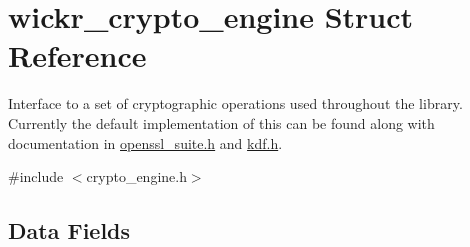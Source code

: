\hypertarget{structwickr__crypto__engine}{}\section{wickr\+\_\+crypto\+\_\+engine Struct Reference}
\label{structwickr__crypto__engine}


Interface to a set of cryptographic operations used throughout the library. Currently the default implementation of this can be found along with documentation in \mbox{\hyperlink{openssl__suite_8h_source}{openssl\+\_\+suite.\+h}} and \mbox{\hyperlink{kdf_8h_source}{kdf.\+h}}.  




{\ttfamily \#include $<$crypto\+\_\+engine.\+h$>$}

\subsection*{Data Fields}
